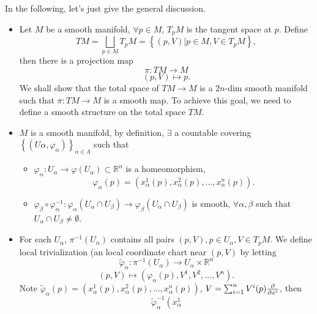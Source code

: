\begin{enumerate}[(1)]
    In the following, let's just give the general discussion.
    \begin{itemize}
        \item Let \(M\) be a smooth manifold, \(\forall p\in M\), 
        \(T_p M\) is the tangent space at \(p\). Define
        \[
            TM=\bigsqcup_{p\in M}T_p M=\left\{(p,V)| p\in M, V\in 
            T_p M\right\}   
        ,\]
        then there is a projection map 
        \[
            \pi\colon TM\to M
            \]
        \[
            (p,V)\mapsto p.      
            \]
        We shall show that the total space of \(TM\to M\) is a \(2n\)-dim
        smooth manifold such that \(\pi\colon TM \to M\) is a smooth map. 
        To achieve this goal, we need to define a smooth structure on the 
        total space \(TM\).
        \item \(M\) is a smooth manifold, by definition, \(\exists\) a
        countable covering \(\left\{\left(U\alpha,\varphi_\alpha\right)
        \right\}_{\alpha\in \Lambda}\) such that
        \begin{itemize}
            \item \(\varphi_\alpha\colon U_\alpha\to \varphi
            \left(U_\alpha\right)\subset \mathbb{R}^n\) is a 
            homeomorphism,
            \[
                \varphi_\alpha(p)=\left(x^1_\alpha(p),
                x^2_\alpha(p),\ldots,x^n_\alpha(p)\right).
            \]
            \item \(\varphi_\beta\circ \varphi_\alpha^{-1}\colon
            \varphi_\alpha\left(U_\alpha\cap U_\beta\right)
            \to \varphi_\beta\left(U_\alpha\cap U_\beta\right)
            \) is smooth, \(\forall\alpha,\beta\) such that 
            \(U_\alpha\cap U_\beta\neq \emptyset\).
        \end{itemize}
        \item For each \(U_\alpha\), \(\pi^{-1}\left(U_\alpha\right)\)
        contains all pairs \((p,V),p\in U_\alpha,V\in T_p M\). We define
        local trivialization (an local coordinate chart near \((p,V)\) 
        by letting 
        \[
            \widetilde{\varphi}_\alpha\colon 
            \pi^{-1}\left(U_\alpha\right)\to U_\alpha\times 
            \mathbb{R}^n
        \]
        \[
            (p,V)\mapsto \left(\varphi_\alpha(p),V^1,V^2,\ldots,
            V^n\right).    
        \]
        Note \(\widetilde{\varphi}_\alpha(p)=\left(x^1_\alpha(p)
        ,x^2_\alpha(p),\ldots,x^n_\alpha(p)\right)\), 
        \(V=\sum_{i=1}^n V^i(p)\pdv{x^i}\), then
        \[\widetilde{\varphi}_\alpha^{-1}\left(x^1_\alpha
\]
\end{itemize}
\end{enumerate}
